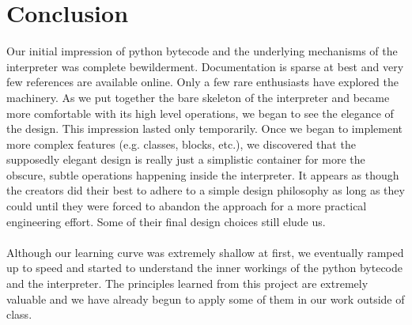\documentclass{article}
\begin{document}
\section{Conclusion}

Our initial impression of python bytecode and the underlying mechanisms of the interpreter was complete bewilderment.  Documentation is sparse at best and very few references are available online.  Only a few rare enthusiasts have explored the machinery.  As we put together the bare skeleton of the interpreter and became more comfortable with its high level operations, we began to see the elegance of the design.  This impression lasted only temporarily.  Once we began to implement more complex features (e.g. classes, blocks, etc.), we discovered that the supposedly elegant design is really just a simplistic container for more the obscure, subtle operations happening inside the interpreter.  It appears as though the creators did their best to adhere to a simple design philosophy as long as they could until they were forced to abandon the approach for a more practical engineering effort.  Some of their final design choices still elude us.\\
\\
 Although our learning curve was extremely shallow at first, we eventually ramped up to speed and started to understand the inner workings of the python bytecode and the interpreter.  The principles learned from this project are extremely valuable and we have already begun to apply some of them in our work outside of class.
\end{document}
